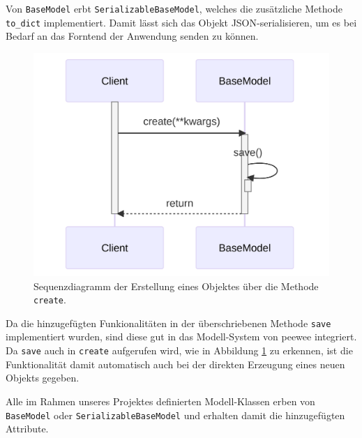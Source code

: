 Von \texttt{BaseModel} erbt \texttt{SerializableBaseModel}, welches die zusätzliche Methode \texttt{to\_dict} implementiert. Damit lässt sich das Objekt JSON-serialisieren, um es bei Bedarf an das Forntend der Anwendung senden zu können.

\begin{figure}[H]
	\centering
	\includegraphics[width=0.75\linewidth]{images/diagrams/database-seq.png}
	\caption{Sequenzdiagramm der Erstellung eines Objektes über die Methode \texttt{create}.}
	\label{fig:database-seq}
\end{figure}

Da die hinzugefügten Funkionalitäten in der überschriebenen Methode \texttt{save} implementiert wurden, sind diese gut in das Modell-System von peewee integriert. Da \texttt{save} auch in \texttt{create} aufgerufen wird, wie in Abbildung \ref{fig:database-seq} zu erkennen, ist die Funktionalität damit automatisch auch bei der direkten Erzeugung eines neuen Objekts gegeben.

Alle im Rahmen unseres Projektes definierten Modell-Klassen erben von \texttt{BaseModel} oder \texttt{SerializableBaseModel} und erhalten damit die hinzugefügten Attribute.